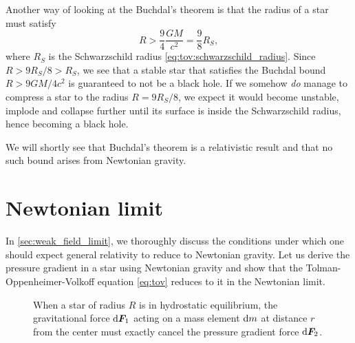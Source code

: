 Another way of looking at the Buchdal's theorem is that the radius of a star must satisfy
\begin{equation}
	R > \frac94 \frac{G M}{c^2} = \frac98 R_S ,
\end{equation}
where $R_S$ is the Schwarzschild radius \eqref{eq:tov:schwarzschild_radius}.
Since $R > 9 R_S / 8 > R_S$, we see that a stable star that satisfies the Buchdal bound $R > 9 G M / 4 c^2$ is guaranteed to not be a black hole.
If we somehow \emph{do} manage to compress a star to the radius $R = 9 R_S / 8$, we expect it would become unstable, implode and collapse further until its surface is inside the Schwarzschild radius, hence becoming a black hole.

We will shortly see that Buchdal's theorem is a relativistic result and that no such bound arises from Newtonian gravity.

\section{Newtonian limit}

In \cref{sec:weak_field_limit}, we thoroughly discuss the conditions under which one should expect general relativity to reduce to Newtonian gravity.
Let us derive the pressure gradient in a star using Newtonian gravity and show that the Tolman-Oppenheimer-Volkoff equation \eqref{eq:tov} reduces to it in the Newtonian limit.

\begin{figure}
\centering
{}
\caption{\label{fig:hydrostatic_equilibrium_sphere}When a star of radius $R$ is in hydrostatic equilibrium, the gravitational force $\mathop{}\!\mathrm{d} {\bm{F}}_1$ acting on a mass element  $\mathop{}\!\mathrm{d} m$ at distance $r$ from the center must exactly cancel the pressure gradient force $\mathop{}\!\mathrm{d} {\bm{F}}_2$.}
\end{figure}

